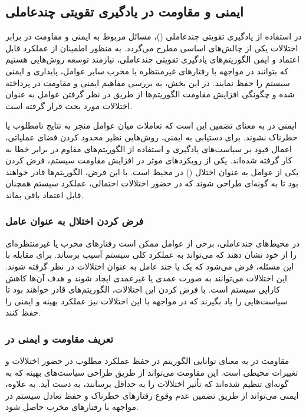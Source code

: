 \subsection{ایمنی و مقاومت در یادگیری تقویتی چندعاملی}

در استفاده از یادگیری تقویتی چندعاملی ()، مسائل مربوط به ایمنی و مقاومت در برابر اختلالات یکی از چالش‌های اساسی مطرح می‌گردد. به منظور اطمینان از عملکرد قابل اعتماد و ایمن الگوریتم‌های یادگیری تقویتی چندعاملی، نیازمند توسعه روش‌هایی هستیم که بتوانند در مواجهه با رفتارهای غیرمنتظره یا مخرب سایر عوامل، پایداری و ایمنی سیستم را حفظ نمایند. در این بخش، به بررسی مفاهیم ایمنی و مقاومت در  پرداخته شده و چگونگی افزایش مقاومت الگوریتم‌ها از طریق در نظر گرفتن عوامل به عنوان اختلالات مورد بحث قرار گرفته است.

ایمنی در  به معنای تضمین این است که تعاملات میان عوامل منجر به نتایج نامطلوب یا خطرناک نشوند. برای دستیابی به ایمنی، روش‌هایی نظیر محدود کردن فضای عملیاتی، اعمال قیود بر سیاست‌های یادگیری و استفاده از الگوریتم‌های مقاوم در برابر خطا به کار گرفته شده‌اند. یکی از رویکردهای موثر در افزایش مقاومت سیستم، فرض کردن یکی از عوامل به عنوان اختلال () در محیط است. با این فرض، الگوریتم‌ها قادر خواهند بود تا به گونه‌ای طراحی شوند که در حضور اختلالات احتمالی، عملکرد سیستم همچنان قابل اعتماد باقی بماند.

\subsubsection{فرض کردن اختلال به عنوان عامل}

در محیط‌های چندعاملی، برخی از عوامل ممکن است رفتارهای مخرب یا غیرمنتظره‌ای را از خود نشان دهند که می‌تواند به عملکرد کلی سیستم آسیب برساند. برای مقابله با این مسئله، فرض می‌شود که یک یا چند عامل به عنوان اختلالات در نظر گرفته شوند. این اختلالات می‌توانند به صورت عمدی یا غیرعمدی ایجاد شوند و هدف آن‌ها کاهش کارایی سیستم است. با فرض کردن این اختلالات، الگوریتم‌های  قادر خواهند بود تا سیاست‌هایی را یاد بگیرند که در مواجهه با این اختلالات نیز عملکرد بهینه و ایمنی را حفظ کنند.

\subsubsection{تعریف مقاومت و ایمنی در }

مقاومت در  به معنای توانایی الگوریتم در حفظ عملکرد مطلوب در حضور اختلالات و تغییرات محیطی است. این مقاومت می‌تواند از طریق طراحی سیاست‌های بهینه که به گونه‌ای تنظیم شده‌اند که تأثیر اختلالات را به حداقل برسانند، به دست آید. به علاوه، ایمنی می‌تواند از طریق تضمین عدم وقوع رفتارهای خطرناک و حفظ تعادل سیستم در مواجهه با رفتارهای مخرب حاصل شود.

